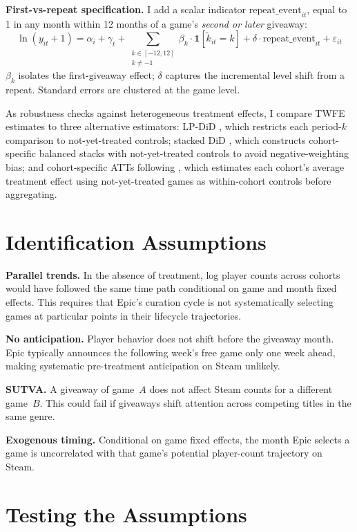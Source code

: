 \documentclass[11pt]{article}
\begin{document}
\textbf{First-vs-repeat specification.} I add a scalar indicator $\text{repeat\_event}_{it}$, equal to 1 in any month within 12 months of a game's \textit{second or later} giveaway:
\begin{equation}
\ln(y_{it}+1) = \alpha_i + \gamma_t + \sum_{\substack{k\in[-12,12]\\k\neq-1}} \beta_k\cdot\mathbf{1}[\tilde{k}_{it}=k] + \delta\cdot\text{repeat\_event}_{it} + \varepsilon_{it}
\end{equation}
$\beta_k$ isolates the first-giveaway effect; $\delta$ captures the incremental level shift from a repeat. Standard errors are clustered at the game level.

As robustness checks against heterogeneous treatment effects, I compare TWFE estimates to three alternative estimators: LP-DiD \citep{dube2023}, which restricts each period-$k$ comparison to not-yet-treated controls; stacked DiD \citep{cengiz2019}, which constructs cohort-specific balanced stacks with not-yet-treated controls to avoid negative-weighting bias; and cohort-specific ATTs following \citet{callaway2021}, which estimates each cohort's average treatment effect using not-yet-treated games as within-cohort controls before aggregating.

\section{Identification Assumptions}

\textbf{Parallel trends.} In the absence of treatment, log player counts across cohorts would have followed the same time path conditional on game and month fixed effects. This requires that Epic's curation cycle is not systematically selecting games at particular points in their lifecycle trajectories.

\textbf{No anticipation.} Player behavior does not shift before the giveaway month. Epic typically announces the following week's free game only one week ahead, making systematic pre-treatment anticipation on Steam unlikely.

\textbf{SUTVA.} A giveaway of game~$A$ does not affect Steam counts for a different game~$B$. This could fail if giveaways shift attention across competing titles in the same genre.

\textbf{Exogenous timing.} Conditional on game fixed effects, the month Epic selects a game is uncorrelated with that game's potential player-count trajectory on Steam.

\section{Testing the Assumptions}
\end{document}
